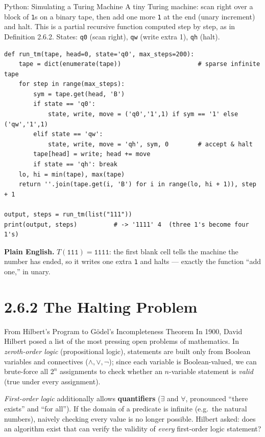 \documentclass[aspectratio=169,10pt]{beamer}
\begin{document}
\begin{frame}[fragile]{Python: Simulating a Turing Machine}
  A tiny Turing machine: scan right over a block of \texttt{1}s on a binary
  tape, then add one more \texttt{1} at the end (unary increment) and halt.
  This is a partial recursive function computed step by step, as in
  Definition 2.6.2. States: \texttt{q0} (scan right), \texttt{qw} (write
  extra 1), \texttt{qh} (halt).
\begin{lstlisting}
def run_tm(tape, head=0, state='q0', max_steps=200):
    tape = dict(enumerate(tape))                     # sparse infinite tape
    for step in range(max_steps):
        sym = tape.get(head, 'B')
        if state == 'q0':
            state, write, move = ('q0','1',1) if sym == '1' else ('qw','1',1)
        elif state == 'qw':
            state, write, move = 'qh', sym, 0        # accept & halt
        tape[head] = write; head += move
        if state == 'qh': break
    lo, hi = min(tape), max(tape)
    return ''.join(tape.get(i, 'B') for i in range(lo, hi + 1)), step + 1

output, steps = run_tm(list("111"))
print(output, steps)          # -> '1111' 4  (three 1's become four 1's)
\end{lstlisting}
  \textbf{Plain English.} $T(\texttt{111}) = \texttt{1111}$: the first blank
  cell tells the machine the number has ended, so it writes one extra
  \texttt{1} and halts --- exactly the function ``add one,'' in unary.
\end{frame}

\section{2.6.2 The Halting Problem}

\begin{frame}{From Hilbert's Program to Gödel's Incompleteness Theorem}
  In 1900, David Hilbert posed a list of the most pressing open problems of
  mathematics. In \emph{zeroth-order logic} (propositional logic), statements
  are built only from Boolean variables and connectives ($\land, \lor, \neg$);
  since each variable is Boolean-valued, we can brute-force all $2^{n}$
  assignments to check whether an $n$-variable statement is \emph{valid} (true
  under every assignment).

  \emph{First-order logic} additionally allows \textbf{quantifiers}
  ($\exists$ and $\forall$, pronounced ``there exists'' and ``for all''). If
  the domain of a predicate is infinite (e.g.\ the natural numbers), naively
  checking every value is no longer possible. Hilbert asked: does an algorithm
  exist that can verify the validity of \emph{every} first-order logic
  statement?
\end{frame}
\end{document}
